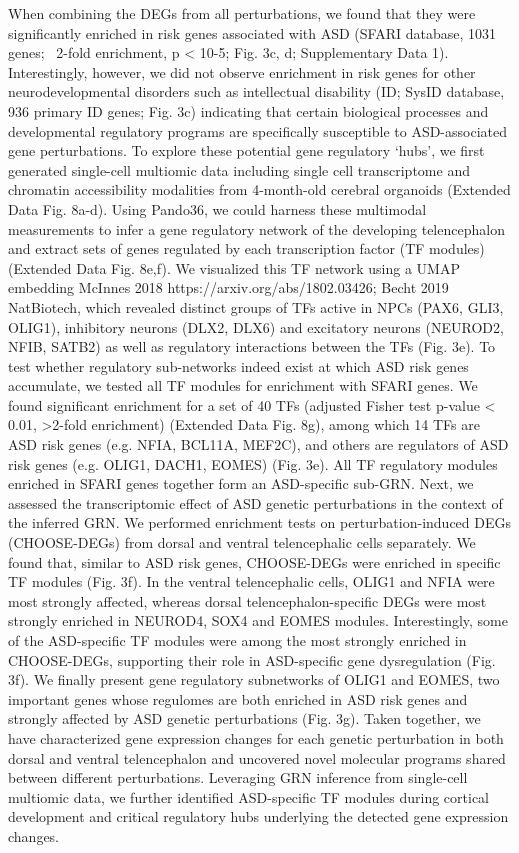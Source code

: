 When combining the DEGs from all perturbations, we found that they were significantly enriched in risk genes associated with ASD (SFARI database, 1031 genes; ~2-fold enrichment, p < 10-5; Fig. 3c, d; Supplementary Data 1). Interestingly, however, we did not observe enrichment in risk genes for other neurodevelopmental disorders such as intellectual disability (ID; SysID database, 936 primary ID genes; Fig. 3c) indicating that certain biological processes and developmental regulatory programs are specifically susceptible to ASD-associated gene perturbations. To explore these potential gene regulatory ‘hubs’, we first generated single-cell multiomic data including single cell transcriptome and chromatin accessibility modalities from 4-month-old cerebral organoids (Extended Data Fig. 8a-d). Using Pando36, we could harness these multimodal measurements to infer a gene regulatory network of the developing telencephalon and extract sets of genes regulated by each transcription factor (TF modules) (Extended Data Fig. 8e,f). We visualized this TF network using a UMAP embedding {McInnes 2018 https://arxiv.org/abs/1802.03426; Becht 2019 NatBiotech}, which revealed distinct groups of TFs active in NPCs (PAX6, GLI3, OLIG1), inhibitory neurons (DLX2, DLX6) and excitatory neurons (NEUROD2, NFIB, SATB2) as well as regulatory interactions between the TFs (Fig. 3e). 
To test whether regulatory sub-networks indeed exist at which ASD risk genes accumulate, we tested all TF modules for enrichment with SFARI genes. We found significant enrichment for a set of 40 TFs (adjusted Fisher test p-value < 0.01, >2-fold enrichment) (Extended Data Fig. 8g), among which 14 TFs are ASD risk genes (e.g. NFIA, BCL11A, MEF2C), and others are regulators of ASD risk genes (e.g. OLIG1, DACH1, EOMES) (Fig. 3e). All TF regulatory modules enriched in SFARI genes together form an ASD-specific sub-GRN.
Next, we assessed the transcriptomic effect of ASD genetic perturbations in the context of the inferred GRN. We performed enrichment tests on perturbation-induced DEGs (CHOOSE-DEGs) from dorsal and ventral telencephalic cells separately. We found that, similar to ASD risk genes, CHOOSE-DEGs were enriched in specific TF modules (Fig. 3f). In the ventral telencephalic cells, OLIG1 and NFIA were most strongly affected, whereas dorsal telencephalon-specific DEGs were most strongly enriched in NEUROD4, SOX4 and EOMES modules. Interestingly, some of the ASD-specific TF modules were among the most strongly enriched in CHOOSE-DEGs, supporting their role in ASD-specific gene dysregulation (Fig. 3f). We finally present gene regulatory subnetworks of OLIG1 and EOMES, two important genes whose regulomes are both enriched in ASD risk genes and strongly affected by ASD genetic perturbations (Fig. 3g). 
Taken together, we have characterized gene expression changes for each genetic perturbation in both dorsal and ventral telencephalon and uncovered novel molecular programs shared between different perturbations. Leveraging GRN inference from single-cell multiomic data, we further identified ASD-specific TF modules during cortical development and critical regulatory hubs underlying the detected gene expression changes.

